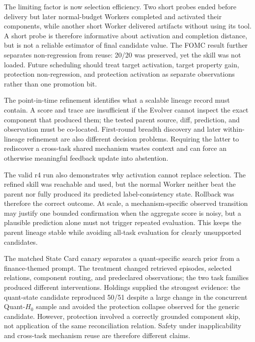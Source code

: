 The limiting factor is now selection efficiency. Two short probes ended before
delivery but later normal-budget Workers completed and activated their
components, while another short Worker delivered artifacts without using its
tool. A short probe is therefore informative about activation and completion
distance, but is not a reliable estimator of final candidate value. The FOMC
result further separates non-regression from reuse: 20/20 was preserved, yet
the skill was not loaded. Future scheduling should treat target activation,
target property gain, protection non-regression, and protection activation as
separate observations rather than one promotion bit.


The point-in-time refinement identifies what a scalable lineage record must
contain. A score and trace are insufficient if the Evolver cannot inspect the
exact component that produced them; the tested parent source, diff, prediction,
and observation must be co-located. First-round breadth discovery and later
within-lineage refinement are also different decision problems. Requiring the
latter to rediscover a cross-task shared mechanism wastes context and can force
an otherwise meaningful feedback update into abstention.

The valid r4 run also demonstrates why activation cannot replace selection.
The refined skill was reachable and used, but the normal Worker neither beat
the parent nor fully produced its predicted label-consistency state. Rollback
was therefore the correct outcome. At scale, a mechanism-specific observed
transition may justify one bounded confirmation when the aggregate score is
noisy, but a plausible prediction alone must not trigger repeated evaluation.
This keeps the parent lineage stable while avoiding all-task evaluation for
clearly unsupported candidates.

The matched State Card canary separates a quant-specific search prior from a
finance-themed prompt. The treatment changed retrieved episodes, selected
relations, component routing, and predeclared observations; the two task
families produced different interventions. Holdings supplied the strongest
evidence: the quant-state candidate reproduced 50/51 despite a large change in
the concurrent Quant-$H_0$ sample and avoided the protection collapse observed
for the generic candidate. However, protection involved a correctly grounded
component skip, not application of the same reconciliation relation. Safety
under inapplicability and cross-task mechanism reuse are therefore different
claims.

